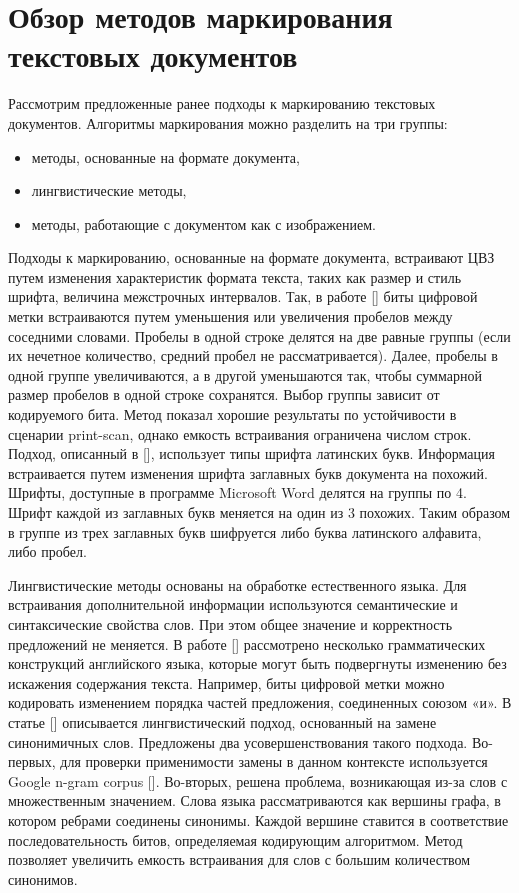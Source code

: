\documentclass[12pt,a4paper]{article}
\begin{document}
\newpage
\section{Обзор методов маркирования текстовых документов}
Рассмотрим предложенные ранее подходы к маркированию текстовых документов.
Алгоритмы маркирования можно разделить на три группы:
\begin{itemize}
\item
методы, основанные на формате документа,
\item
лингвистические методы,
\item
методы, работающие с документом как с изображением.
\end{itemize}

Подходы к маркированию, основанные на формате документа, встраивают ЦВЗ путем изменения характеристик формата текста, таких как размер и стиль шрифта, величина межстрочных интервалов.
Так, в работе [] биты цифровой метки встраиваются путем уменьшения или увеличения пробелов между соседними словами.
Пробелы в одной строке делятся на две равные группы (если их нечетное количество, средний пробел не рассматривается).
Далее, пробелы в одной группе увеличиваются, а в другой уменьшаются так, чтобы суммарной размер пробелов в одной строке сохранятся.
Выбор группы зависит от кодируемого бита.
Метод показал хорошие результаты по устойчивости в сценарии print-scan, однако емкость встраивания ограничена числом строк.
Подход, описанный в [], использует типы шрифта латинских букв.
Информация встраивается путем изменения шрифта заглавных букв документа на похожий.
Шрифты, доступные в программе Microsoft Word делятся на группы по 4.
Шрифт каждой из заглавных букв меняется на один из 3 похожих.
Таким образом в группе из трех заглавных букв шифруется либо буква латинского алфавита, либо пробел.

Лингвистические методы основаны на обработке естественного языка.
Для встраивания дополнительной информации используются семантические и синтаксические свойства слов.
При этом общее значение и корректность предложений не меняется.
В работе [] рассмотрено несколько грамматических конструкций английского языка, которые могут быть подвергнуты изменению без искажения содержания текста.
Например, биты цифровой метки можно кодировать изменением порядка частей предложения, соединенных союзом «и».
В статье [] описывается лингвистический подход, основанный на замене синонимичных слов.
Предложены два усовершенствования такого подхода.
Во-первых, для проверки применимости замены в данном контексте используется Google n-gram corpus [].
Во-вторых, решена проблема, возникающая из-за слов с множественным значением.
Слова языка рассматриваются как вершины графа, в котором ребрами соединены синонимы.
Каждой вершине ставится в соответствие последовательность битов, определяемая кодирующим алгоритмом.
Метод позволяет увеличить емкость встраивания для слов с большим количеством синонимов.
\end{document}
